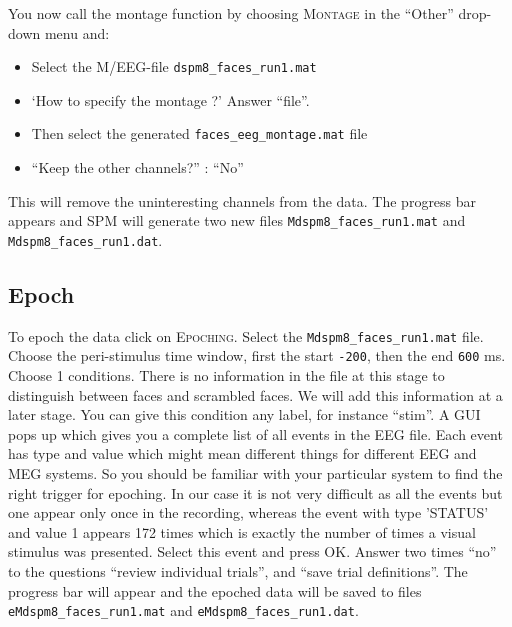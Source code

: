 You now call the montage function by choosing \textsc{Montage} in the ``Other'' drop-down menu and:
\begin{itemize}
\item{Select the M/EEG-file \texttt{dspm8\_faces_run1.mat}}
\item{`How to specify the montage ?' Answer ``file''.}
\item{Then select the generated \texttt{faces\_eeg\_montage.mat} file}
\item{``Keep the other channels?'' : ``No''}
\end{itemize}
This will remove the uninteresting channels from the data. The progress bar appears and SPM will generate two new files \texttt{Mdspm8\_faces_run1.mat} and \texttt{Mdspm8\_faces_run1.dat}.

\subsection{Epoch}
To epoch the data click on \textsc{Epoching}. Select the \texttt{Mdspm8\_faces_run1.mat} file. Choose the peri-stimulus time window, first the start \texttt{-200}, then the end \texttt{600} ms. Choose 1 conditions. There is no information in the file at this stage to distinguish between faces and scrambled faces. We will add this information at a later stage. You can give this condition any label, for instance ``stim''. A GUI pops up which gives you a complete list of all events in the EEG file. Each event has type and value which might mean different things for different EEG and MEG systems. So you should be familiar with your particular system to find the right trigger for epoching. In our case it is not very difficult as all the events but one appear only once in the recording, whereas the event with type 'STATUS' and value 1 appears 172 times which is exactly the number of times a visual stimulus was presented. Select this event and press OK. Answer two times ``no'' to the questions ``review individual trials'', and ``save trial definitions''. The progress bar will appear and the epoched data will be saved to files \texttt{eMdspm8\_faces_run1.mat} and \texttt{eMdspm8\_faces_run1.dat}. 



